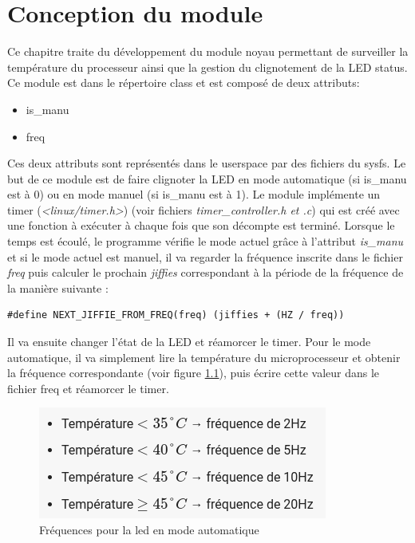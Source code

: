 \documentclass{ReportTemplate}
\begin{document}
\chapter{Conception du module}
Ce chapitre traite du développement du module noyau permettant de surveiller la
température du processeur ainsi que la gestion du clignotement de la LED status.
Ce module est dans le répertoire class et est composé de deux attributs:
\begin{itemize}
    \item is\_manu
    \item freq
\end{itemize}
Ces deux attributs sont représentés dans le userspace par des fichiers du sysfs.
Le but de ce module est de faire clignoter la LED en mode automatique (si
is\_manu est à 0) ou en mode manuel (si is\_manu est à 1). Le module implémente
un timer (\textit{<linux/timer.h>}) (voir fichiers \textit{timer\_controller.h
et .c}) qui est créé avec une fonction à exécuter à
chaque fois que son décompte est terminé. Lorsque le temps est écoulé, le
programme vérifie le mode actuel grâce à l'attribut \textit{is\_manu} et si le
mode actuel est manuel, il va regarder la fréquence inscrite dans le fichier
\textit{freq} puis calculer le prochain \textit{jiffies} correspondant à la
période de la fréquence de la manière suivante :
\begin{verbatim}
#define NEXT_JIFFIE_FROM_FREQ(freq) (jiffies + (HZ / freq))
\end{verbatim}
Il va ensuite changer l'état de la LED et réamorcer le timer.\newline
Pour le mode automatique, il va simplement lire la température du
microprocesseur et obtenir la fréquence correspondante (voir figure
\ref{fig:ledFrequencies}), puis écrire cette valeur dans le fichier freq et
réamorcer le timer.
\begin{figure}[H]
    \includegraphics[width= \textwidth]{imageSources/Led_Frequencies.png}
    \caption{Fréquences pour la led en mode automatique}
    \label{fig:ledFrequencies}
\end{figure}
\end{document}
